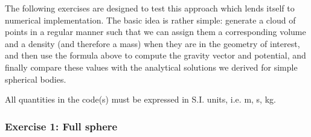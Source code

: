 The following exercises are designed to test this approach which lends itself to 
numerical implementation. 
The basic idea is rather simple: generate a cloud of points in a regular manner such that 
we can assign them a corresponding volume and a density (and therefore a mass)
when they are in the geometry of interest, 
and then use the formula above to compute the gravity vector and potential, and finally 
compare these values with the analytical solutions we derived for simple spherical bodies. 


{\color{red} All quantities in the code(s) must be expressed in S.I. units, i.e. \si{\metre}, \si{\second}, \si{\kilo\gram}. }


\subsubsection*{Exercise 1: Full sphere}

